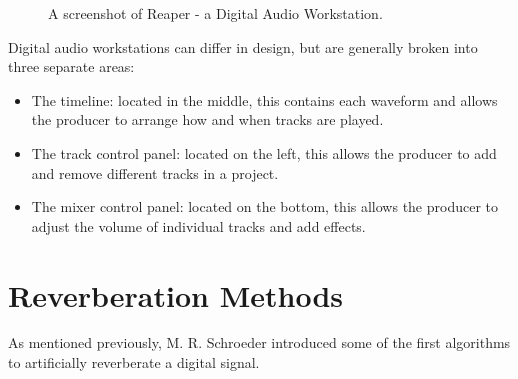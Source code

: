 \begin{figure}[h] %
	\begin{center}
		\caption{A screenshot of Reaper - a Digital Audio Workstation.}
	\end{center}
\end{figure}

Digital audio workstations can differ in design, but are generally broken into three separate areas:

\begin{itemize}
  \item The timeline: located in the middle, this contains each waveform and allows the producer to arrange how and when tracks are played.
  \item The track control panel: located on the left, this allows the producer to add and remove different tracks in a project.
  \item The mixer control panel: located on the bottom, this allows the producer to adjust the volume of individual tracks and add effects.
\end{itemize}

\section{Reverberation Methods}
As mentioned previously, M. R. Schroeder introduced some of the first algorithms to artificially reverberate a digital signal.

